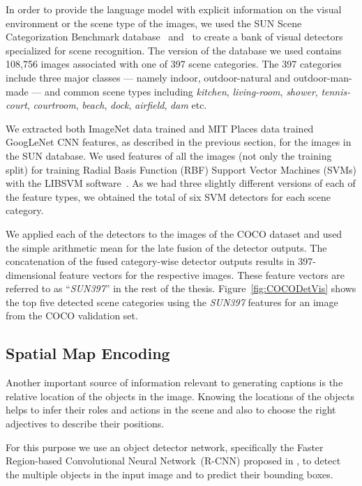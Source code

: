 In order to provide the language model with explicit information on the visual
environment or the scene type of the images, we used the SUN Scene
Categorization Benchmark database~\cite{Xiao2010} and~\cite{Xiao2014} to create
a bank of visual detectors specialized for scene recognition.
The version of the database we used contains 108,756 images associated with one
of 397 scene categories.
The 397 categories include three major classes --- namely indoor, outdoor-natural
and outdoor-man-made --- and common scene types including \emph{kitchen},
\emph{living-room}, \emph{shower}, \emph{tennis-court}, \emph{courtroom},
\emph{beach}, \emph{dock}, \emph{airfield}, \emph{dam} etc. 

We extracted both ImageNet data trained and MIT Places data trained GoogLeNet
CNN features, as described in the previous section, for the images in the SUN
database.
We used features of all the images (not only the training split) for
training Radial Basis Function (RBF) Support Vector Machines (SVMs) with the
LIBSVM software~\cite{LIBSVM}.
As we had three slightly different versions of each of the feature types, we
obtained the total of six SVM detectors for each scene category.

We applied each of the detectors to the images of the COCO dataset and used the
simple arithmetic mean for the late fusion of the detector outputs.
The concatenation of the fused category-wise detector outputs results in
397-dimensional feature vectors for the respective images.
These feature vectors are referred to as ``\emph{SUN397}'' in the rest of the
thesis.
Figure~\ref{fig:COCODetVis} shows the top five detected scene categories using
the \emph{SUN397} features for an image from the COCO validation set.

\subsection{Spatial Map Encoding}
\label{sec:frcnnfeat}
Another important source of information relevant to generating captions is the
relative location of the objects in the image. 
Knowing the locations of the objects helps to infer their roles and actions in
the scene and also to choose the right adjectives to describe their positions.

For this purpose we use an object detector network, specifically the Faster
Region-based Convolutional Neural Network~(R-CNN) proposed in
\cite{ren15fasterrcnn}, to detect the multiple objects in the input image and to
predict their bounding boxes.

